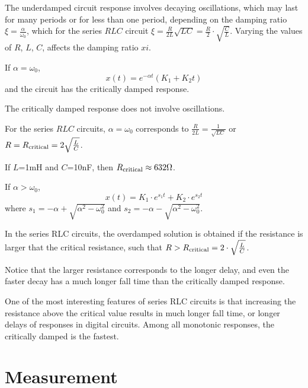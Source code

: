 \documentclass[a4paper]{report}
\begin{document}
	The underdamped circuit response involves decaying oscillations, which may last for many periods or for less than one period, depending on the damping ratio $\xi=\frac{\alpha}{\omega_0}$, which for the series $RLC$ circuit $\xi=\frac{R}{2L}\sqrt{LC}=\frac{R}{2}\cdot\sqrt{\frac{C}{L}}$. Varying the values of $R$, $L$, $C$, affects the damping ratio $xi$.
	
	If $\alpha=\omega_0$,
	\begin{equation*}
		x(t)=e^{-\alpha t}(K_1+K_2t)
	\end{equation*}
	and the circuit has the critically damped response.
	
	The critically damped response does not involve oscillations.
	
	For the series $RLC$ circuits, $\alpha=\omega_0$ corresponds to $\frac{R}{2L}=\frac{1}{\sqrt{LC}}$ or $R=R_{\rm{critical}}=2\sqrt{\frac{L}{C}}$.
	
	If $L$=1mH and $C$=10nF, then $R_{\rm{critical}}\approx632\Omega$.
	
	If $\alpha>\omega_0$,
	\begin{equation*}
		x(t)=K_1\cdot e^{s_1t}+K_2\cdot e^{s_2t}
	\end{equation*}
	where $s_1=-\alpha+\sqrt{\alpha^2-\omega_0^2}$ and $s_2=-\alpha-\sqrt{\alpha^2-\omega_0^2}$.
	
	In the series RLC circuits, the overdamped solution is obtained if the resistance is larger that the critical resistance, such that $R>R_{\rm{critical}}=2\cdot\sqrt{\frac{L}{C}}$.
	
	Notice that the larger resistance corresponds to the longer delay, and even the faster decay has a much longer fall time than the critically damped response.
	
	One of the most interesting features of series RLC circuits is that increasing the resistance above the critical value results in much longer fall time, or longer delays of responses in digital circuits. Among all monotonic responses, the critically damped is the fastest.
	\section{Measurement}
\end{document}

